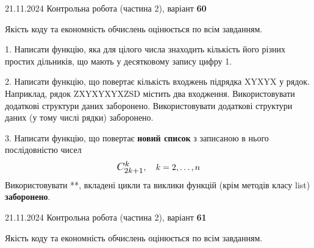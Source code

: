 \documentclass[12pt, ukrainian]{article}
\begin{document}
{{21.11.2024 Контрольна робота  (частина 2), варіант  \No \textbf { 60 }\par}}


{
\begin {large}
Якість коду та економність обчислень оцінюється по всім завданням.

\vspace{5mm}

1. Написати функцію, яка для цілого числа знаходить кількість його різних простих дільників, що мають у десятковому запису цифру 1.

\vspace{10mm}


2. Написати функцію, що повертає кількість входжень підрядка XYXYX у рядок. Наприклад, рядок ZXYXYXYXZSD містить два входження. Використовувати додаткові структури даних заборонено. Використовувати додаткові структури даних (у тому числі рядки) заборонено.

\vspace{10mm}


3. 
Написати функцію, що повертає \textbf{новий список} з записаною в нього послідовністю чисел
$$\scalebox{1.2}{$C_{2k+1}^{k}$}, \quad k=2,\ldots,n$$
Використовувати **, вкладені цикли та виклики функцій (крім методів класу list) \textbf{заборонено}.

\end{large}
\vspace{25mm}


{{21.11.2024 Контрольна робота  (частина 2), варіант  \No \textbf { 61 }\par}}


{
\begin {large}
Якість коду та економність обчислень оцінюється по всім завданням.


\end{large}}}
\end{document}
